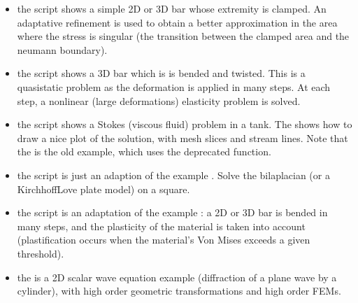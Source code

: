 \documentclass[a4paper,11pt,english]{sphinxmanual}
\begin{document}
\label{\detokenize{matlab_octave/examples:other-examples}}\begin{itemize}
\item {} 
the  script shows a simple 2D or 3D bar whose extremity is
clamped. An adaptative refinement is used to obtain a better approximation in
the area where the stress is singular (the transition between the clamped area
and the neumann boundary).

\item {} 
the  script shows a 3D bar which is is
bended and twisted. This is a quasi\sphinxhyphen{}static problem as the deformation is
applied in many steps. At each step, a non\sphinxhyphen{}linear (large deformations)
elasticity problem is solved.

\item {} 
the  script shows a Stokes (viscous fluid) problem
in a tank. The  shows how to draw a nice plot
of the solution, with mesh slices and stream lines. Note that the
 is the old example, which uses the deprecated
 function.

\item {} 
the  script is just an adaption of the  example
. Solve the bilaplacian (or a Kirchhoff\sphinxhyphen{}Love plate
model) on a square.

\item {} 
the  script is an adaptation of the  example
: a 2D or 3D bar is bended in many steps, and the
plasticity of the material is taken into account (plastification occurs when
the material’s Von Mises exceeds a given threshold).

\item {} 
the  is a 2D scalar wave equation example (diffraction of
a plane wave by a cylinder), with high order geometric transformations and high
order FEMs.

\end{itemize}
\end{document}
